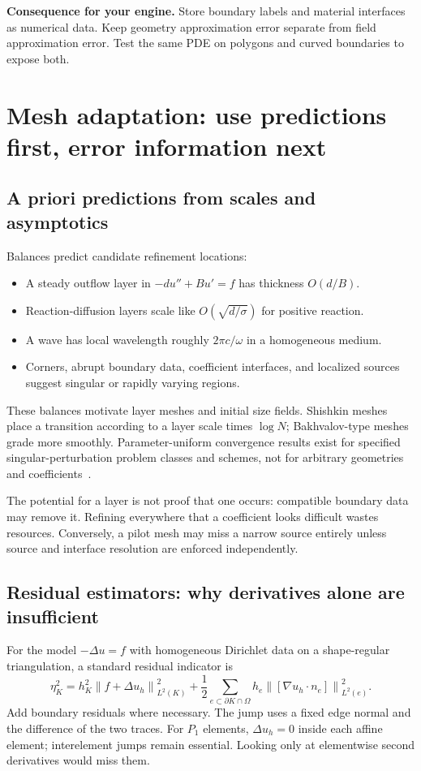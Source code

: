 \documentclass[11pt,a4paper]{article}
\newcommand{\norm}[1]{\left\lVert #1\right\rVert}
\newcommand{\decision}[1]{\par\smallskip\noindent\textcolor{accent}{\textbf{Consequence for your engine.}} #1\par}
\begin{document}
\decision{Store boundary labels and material interfaces as numerical data. Keep geometry approximation error separate from field approximation error. Test the same PDE on polygons and curved boundaries to expose both.}

\section{Mesh adaptation: use predictions first, error information next}\label{sec:mesh}
\subsection{A priori predictions from scales and asymptotics}
Balances predict candidate refinement locations:
\begin{itemize}
\item A steady outflow layer in $-d u''+B u'=f$ has thickness $O(d/B)$.
\item Reaction-diffusion layers scale like $O(\sqrt{d/\sigma})$ for positive reaction.
\item A wave has local wavelength roughly $2\pi c/\omega$ in a homogeneous medium.
\item Corners, abrupt boundary data, coefficient interfaces, and localized sources suggest singular or rapidly varying regions.
\end{itemize}
These balances motivate layer meshes and initial size fields. Shishkin meshes place a transition according to a layer scale times $\log N$; Bakhvalov-type meshes grade more smoothly. Parameter-uniform convergence results exist for specified singular-perturbation problem classes and schemes, not for arbitrary geometries and coefficients~\cite{roos}.

The potential for a layer is not proof that one occurs: compatible boundary data may remove it. Refining everywhere that a coefficient looks difficult wastes resources. Conversely, a pilot mesh may miss a narrow source entirely unless source and interface resolution are enforced independently.

\subsection{Residual estimators: why derivatives alone are insufficient}
For the model $-\Delta u=f$ with homogeneous Dirichlet data on a shape-regular triangulation, a standard residual indicator is
\begin{equation}\label{eq:estimator}
\eta_K^2=h_K^2\norm{f+\Delta u_h}_{L^2(K)}^2
+\frac12\sum_{e\subset\partial K\cap\Omega}
h_e\norm{[\nabla u_h\cdot n_e]}_{L^2(e)}^2.
\end{equation}
Add boundary residuals where necessary. The jump uses a fixed edge normal and the difference of the two traces. For $P_1$ elements, $\Delta u_h=0$ inside each affine element; interelement jumps remain essential. Looking only at elementwise second derivatives would miss them.
\end{document}
